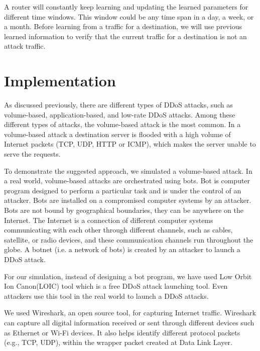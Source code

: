 \documentclass[12pt,oneside,a4paper]{article}
\begin{document}
A router will constantly keep learning and updating the learned parameters for different time windows. This window could be any time span in a day, a week, or a month. Before learning from a traffic for a destination, we will use previous learned information to verify that the current traffic for a destination is not an attack traffic.

\pagebreak

\section{Implementation} \label{sec:Implementation}

As discussed previously, there are different types of DDoS attacks, such as volume-based, application-based, and low-rate DDoS attacks. Among these different types of attacks, the volume-based attack is the most common. In a volume-based attack a destination server is flooded with a high volume of Internet packets (TCP, UDP, HTTP or ICMP), which makes the server unable to serve the requests.

To demonstrate the suggested approach, we simulated a volume-based attack. In a real world, volume-based attacks are orchestrated using bots. Bot\cite{bot} is computer program designed to perform a particular task and is under the control of an attacker. Bots are installed on a compromised computer systems by an attacker. Bots are not bound by geographical boundaries, they can be anywhere on the Internet. The Internet is a connection of different computer systems communicating with each other through different channels, such as cables, satellite, or radio devices, and these communication channels run throughout the globe. A botnet (i.e. a network of bots) is created by an attacker to launch a DDoS attack.

For our simulation, instead of designing a bot program, we have used Low Orbit Ion Canon(LOIC) tool which is a free DDoS attack launching tool. Even attackers use this tool in the real world to launch a DDoS attacks.

We used Wireshark, an open source tool, for capturing Internet traffic. Wireshark can capture all digital information received or sent through different devices such as Ethernet or Wi-Fi devices. It also helps identify different protocol packets (e.g., TCP, UDP), within the wrapper packet created at Data Link Layer.\par
\end{document}
